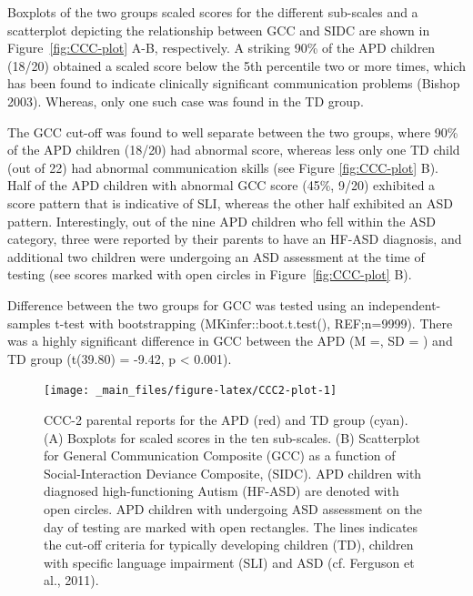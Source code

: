 \documentclass[a4paper, twoside]{templates/ociamthesis}
\begin{document}
Boxplots of the two groups scaled scores for the different sub-scales and a scatterplot depicting the relationship between GCC and SIDC are shown in Figure~\ref{fig:CCC-plot} A-B, respectively. A striking 90\% of the APD children (18/20) obtained a scaled score below the 5th percentile two or more times, which has been found to indicate clinically significant communication problems (Bishop 2003). Whereas, only one such case was found in the TD group.

The GCC cut-off was found to well separate between the two groups, where 90\% of the APD children (18/20) had abnormal score, whereas less only one TD child (out of 22) had abnormal communication skills (see Figure \ref{fig:CCC-plot} B). Half of the APD children with abnormal GCC score (45\%, 9/20) exhibited a score pattern that is indicative of SLI, whereas the other half exhibited an ASD pattern. Interestingly, out of the nine APD children who fell within the ASD category, three were reported by their parents to have an HF-ASD diagnosis, and additional two children were undergoing an ASD assessment at the time of testing (see scores marked with open circles in Figure~\ref{fig:CCC-plot} B).

Difference between the two groups for GCC was tested using an independent-samples t-test with bootstrapping (MKinfer::boot.t.test(), REF;n=9999). There was a highly significant difference in GCC between the APD (M =, SD = ) and TD group (t(39.80) = -9.42, p \textless{} 0.001).

\begin{figure}

{\centering \texttt{[image: \_main\_files/figure-latex/CCC2-plot-1]} 

}

\caption{CCC-2 parental reports for the APD (red) and TD group (cyan). (A) Boxplots for scaled scores in the ten sub-scales. (B) Scatterplot for General Communication Composite (GCC) as a function of Social-Interaction Deviance Composite, (SIDC). APD children with diagnosed high-functioning Autism (HF-ASD) are denoted with open circles. APD children with undergoing ASD assessment on the day of testing are marked with open rectangles. The lines indicates the cut-off criteria for typically developing children (TD), children with specific language impairment (SLI) and ASD (cf. Ferguson et al., 2011).}\label{fig:CCC2-plot}
\end{figure}
\end{document}

